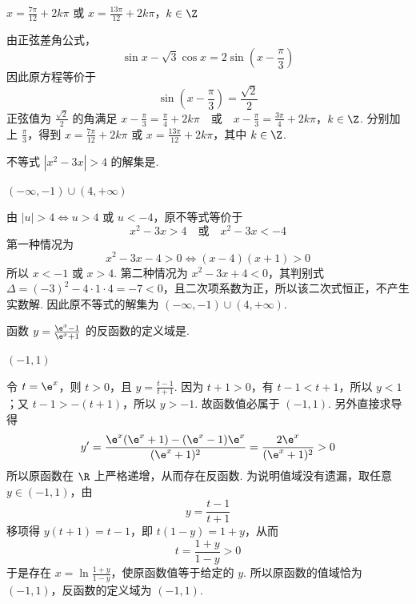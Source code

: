 \documentclass[UTF8,a4paper,oneside,11pt]{ctexbook}
\begin{document}
\begin{answer}
\(x = \frac{7\pi}{12} + 2k\pi\) 或 \(x = \frac{13\pi}{12} + 2k\pi\)，\(k \in \Z\)
\end{answer}

\begin{solution}
由正弦差角公式，
\[
\sin x-\sqrt3\cos x=2\sin\left(x-\frac{\pi}{3}\right)
\]
因此原方程等价于
\[
\sin\left(x-\frac\pi3\right)=\frac{\sqrt2}{2}
\]
正弦值为 \(\frac{\sqrt2}{2}\) 的角满足
\(x-\frac{\pi}{3}=\frac{\pi}{4}+2k\pi\quad\text{或}\quad x-\frac{\pi}{3}=\frac{3\pi}{4}+2k\pi\)，\(k\in\Z\).
分别加上 \(\frac{\pi}{3}\)，得到 \(x=\frac{7\pi}{12}+2k\pi\) 或 \(x=\frac{13\pi}{12}+2k\pi\)，其中 \(k\in\Z\).
\end{solution}

\begin{problem}
不等式 \(|x^2 - 3x| > 4\) 的解集是\fillinblank{}.
\end{problem}

\begin{answer}
\((-\infty,-1) \cup (4,+\infty)\)
\end{answer}

\begin{solution}
由 \(|u|>4\iff u>4\) 或 \(u<-4\)，原不等式等价于
\[
x^2-3x>4\quad\text{或}\quad x^2-3x<-4
\]
第一种情况为
\[
x^2-3x-4>0\iff (x-4)(x+1)>0
\]
所以 \(x<-1\) 或 \(x>4\). 第二种情况为 \(x^2-3x+4<0\)，其判别式 \(\Delta=(-3)^2-4\cdot1\cdot4=-7<0\)，且二次项系数为正，所以该二次式恒正，不产生实数解. 因此原不等式的解集为 \((-\infty,-1)\cup(4,+\infty)\).
\end{solution}

\begin{problem}
函数 \(y = \frac{\e^x - 1}{\e^x + 1}\) 的反函数的定义域是\fillinblank{}.
\end{problem}

\begin{answer}
\((-1,1)\)
\end{answer}

\begin{solution}
令 \(t=\e^x\)，则 \(t>0\)，且 \(y=\frac{t-1}{t+1}\). 因为 \(t+1>0\)，有 \(t-1<t+1\)，所以 \(y<1\)；又 \(t-1>-(t+1)\)，所以 \(y>-1\). 故函数值必属于 \((-1,1)\). 另外直接求导得
\[
y'=\frac{\e^x(\e^x+1)-(\e^x-1)\e^x}{(\e^x+1)^2}=\frac{2\e^x}{(\e^x+1)^2}>0
\]
所以原函数在 \(\R\) 上严格递增，从而存在反函数. 为说明值域没有遗漏，取任意 \(y\in(-1,1)\)，由
\[
y=\frac{t-1}{t+1}
\]
移项得 \(y(t+1)=t-1\)，即 \(t(1-y)=1+y\)，从而
\[
t=\frac{1+y}{1-y}>0
\]
于是存在 \(x=\ln\frac{1+y}{1-y}\)，使原函数值等于给定的 \(y\). 所以原函数的值域恰为 \((-1,1)\)，反函数的定义域为 \((-1,1)\).
\end{solution}
\end{document}
